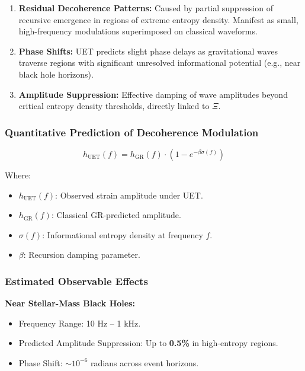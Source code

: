 \documentclass[12pt,a4paper]{article}
\begin{document}
\begin{enumerate}
    \item \textbf{Residual Decoherence Patterns:}  
    Caused by partial suppression of recursive emergence in regions of extreme entropy density. Manifest as small, high-frequency modulations superimposed on classical waveforms.
    
    \item \textbf{Phase Shifts:}  
    UET predicts slight phase delays as gravitational waves traverse regions with significant unresolved informational potential (e.g., near black hole horizons).
    
    \item \textbf{Amplitude Suppression:}  
    Effective damping of wave amplitudes beyond critical entropy density thresholds, directly linked to \(\Xi\).
\end{enumerate}

\subsubsection*{Quantitative Prediction of Decoherence Modulation}

\[
h_{\text{UET}}(f) = h_{\text{GR}}(f) \cdot \left(1 - e^{-\beta \sigma(f)}\right)
\]

Where:
\begin{itemize}
    \item \(h_{\text{UET}}(f)\): Observed strain amplitude under UET.
    \item \(h_{\text{GR}}(f)\): Classical GR-predicted amplitude.
    \item \(\sigma(f)\): Informational entropy density at frequency \(f\).
    \item \(\beta\): Recursion damping parameter.
\end{itemize}

\subsubsection*{Estimated Observable Effects}

\textbf{Near Stellar-Mass Black Holes:}
\begin{itemize}
    \item Frequency Range: 10 Hz – 1 kHz.
    \item Predicted Amplitude Suppression: Up to \textbf{0.5\%} in high-entropy regions.
    \item Phase Shift: \(\sim 10^{-6}\) radians across event horizons.
\end{itemize}
\end{document}
